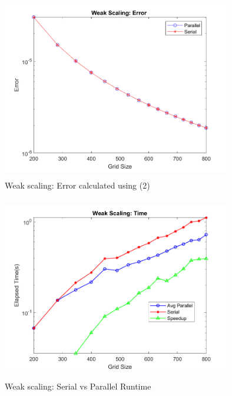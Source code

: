 \documentclass[12pt]{article}
\begin{document}
		\begin{figure}[H]
		\centering
		\includegraphics[width=100mm,height=80mm]{weakerror.png}
		\caption{Weak scaling: Error calculated using (2)}
	\end{figure}
	\begin{figure}[H]
		\centering
		\includegraphics[width=100mm,height=80mm]{weaktime.png}
		\caption{Weak scaling: Serial vs Parallel Runtime}
	\end{figure}
		\newpage	
		
		
\end{document}
